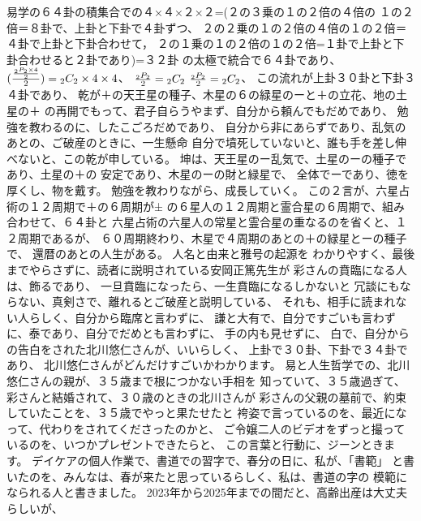\documentclass{jsarticle}
\begin{document}
\title{}
\author{}
\date{}
\maketitle


      易学の６４卦の積集合での４×４×２×２=(２の３乗の１の２倍の４倍の
  １の２倍＝８卦で、上卦と下卦で４卦ずつ、
  ２の２乗の１の２倍の４倍の１の２倍＝４卦で上卦と下卦合わせて，
  ２の１乗の１の２倍の１の２倍=１卦で上卦と下卦合わせると２卦であり)=３２卦
  の太極で統合で６４卦であり、${({{{{{{}_2P_2} \times 4} \over 2}}\over 2})}
  = {}_2C_2 \times 4 \times 4 $、
  $ {{{{}_2P_2} \over 2}} = {}_2C_2 $ $ {{}_2P_2 \over 2}= {}_2C_2 $、
  この流れが上卦３０卦と下卦３４卦であり、
  乾が＋の天王星の種子、木星の６の緑星のーと＋の立花、地の土星の＋
  の再開でもって、君子自らうやまず、自分から頼んでもだめであり、
  勉強を教わるのに、したこごろだめであり、
  自分から非にあらずであり、乱気のあとの、ご破産のときに、一生懸命
  自分で墳死していないと、誰も手を差し伸べないと、この乾が申している。
  坤は、天王星のー乱気で、土星のーの種子であり、土星の＋の
  安定であり、木星のーの財と緑星で、
  全体でーであり、徳を厚くし、物を戴す。
  勉強を教わりながら、成長していく。
  この２言が、六星占術の１２周期で＋の６周期が±
  の６星人の１２周期と霊合星の６周期で、組み合わせて、６４卦と
  六星占術の六星人の常星と霊合星の重なるのを省くと、１２周期であるが、
  ６０周期終わり、木星で４周期のあとの＋の緑星とーの種子で、
  還暦のあとの人生がある。
  人名と由来と雅号の起源を
  わかりやすく、最後までやらさずに、読者に説明されている安岡正篤先生が
  彩さんの賁臨になる人は、飾るであり、
  一旦賁臨になったら、一生賁臨になるしかないと
  冗談にもならない、真剣さで、離れるとご破産と説明している、
  それも、相手に読まれない人らしく、自分から臨席と言わずに、
  謙と大有で、自分ですごいも言わずに、泰であり、自分でだめとも言わずに、
  手の内も見せずに、
  白で、自分からの告白をされた北川悠仁さんが、いいらしく、
  上卦で３０卦、下卦で３４卦であり、
  北川悠仁さんがどんだけすごいかわかります。
  易と人生哲学での、北川悠仁さんの親が、３５歳まで根につかない手相を
  知っていて、３５歳過ぎて、彩さんと結婚されて、３０歳のときの北川さんが
  彩さんの父親の墓前で、約束していたことを、３５歳でやっと果たせたと
  袴姿で言っているのを、最近になって、代わりをされてくださったのかと、
  ご令嬢二人のビデオをずっと撮っているのを、いつかプレゼントできたらと、
  この言葉と行動に、ジーンときます。
  デイケアの個人作業で、書道での習字で、春分の日に、私が、「書範」
  と書いたのを、みんなは、春が来たと思っているらしく、私は、書道の字の
  模範になられる人と書きました。
        2023年から2025年までの間だと、高齢出産は大丈夫らしいが、
\end{document}
